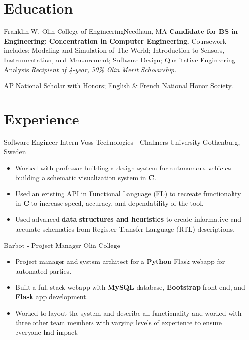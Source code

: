 \documentclass[11 pt]{moderncv}
\begin{document}
\maketitle

\vspace{-.6in}

\section{Education}

{Franklin W. Olin College of Engineering}{}{Needham, MA}{}
{
	\textbf{Candidate for BS in Engineering: Concentration in Computer Engineering.}
	  Coursework includes:
    Modeling and Simulation of The World;
    Introduction to Sensors, Instrumentation, and Measurement;
    Software Design;
    Qualitative Engineering Analysis
	\newline
	\textit{Recipient of 4-year, 50\% Olin Merit Scholarship.}
}

{
	AP National Scholar with Honors; English \& French National Honor Society.
	\begin{flushright}
	\vspace {-0.3 in}
	\end{flushright}
	\vspace {-0.1 in}
}

\section{Experience}
\vspace{0.06 in}

{Software Engineer Intern}
{Voss Technologies - Chalmers University}
{Gothenburg, Sweden}
{}
{
\begin{itemize}
	\item Worked with professor building a design system for autonomous vehicles building a schematic visualization system in \textbf{C}. 
	\item Used an existing API in Functional Language (FL) to recreate functionality in \textbf{C} to increase speed, accuracy, and dependability of the tool. 
	\item Used advanced \textbf{data structures and heuristics} to create informative and accurate schematics from Register Transfer Language (RTL) descriptions.
\end{itemize}
}


{Barbot -  Project Manager}
{Olin College}
{}
{}
{
\begin{itemize}
	\item Project manager and system architect for a \textbf{Python} Flask webapp for automated parties. 
	\item Built a full stack webapp with \textbf{MySQL} database, \textbf{Bootstrap} front end, and \textbf{Flask} app development. 
	\item Worked to layout the system and describe all functionality and worked with three other team members with varying levels of experience to ensure everyone had impact. 
\end{itemize}
}
\end{document}
